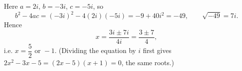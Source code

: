 Here $a=2i$, $b=-3i$, $c=-5i$, so
\[b^2-4ac=(-3i)^2-4(2i)(-5i)=-9+40i^2=-49,\qquad\sqrt{-49}=7i.\]
Hence
\[x=\dfrac{3i\pm7i}{4i}=\dfrac{3\pm7}{4},\]
i.e. $x=\boxed{\dfrac52\text{ or }-1}$. (Dividing the equation by $i$ first gives $2x^2-3x-5=(2x-5)(x+1)=0$, the same roots.)
